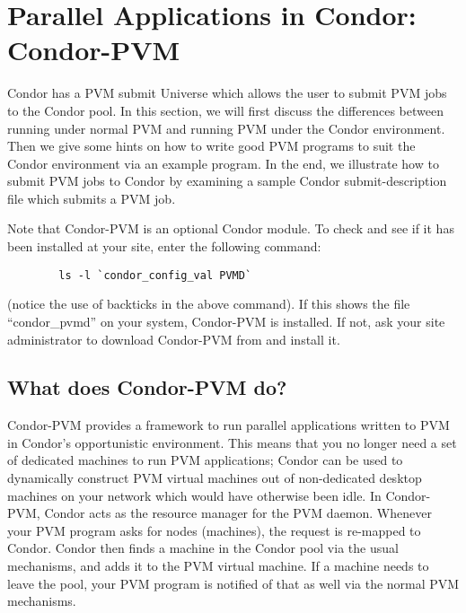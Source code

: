 \section{\label{sec:PVM}Parallel Applications in Condor: Condor-PVM}

\newcommand{\func}[1]{\texttt{#1}}

Condor has a PVM submit Universe which allows the user to submit PVM jobs to
the Condor pool.  In this section, we will first
discuss the differences between running under normal PVM and running PVM under the Condor
environment.  Then we give some hints on how to write good PVM
programs to suit the Condor environment via an example program.  In the
end, we illustrate how to submit PVM jobs to Condor by examining a
sample Condor submit-description file which submits a PVM job.

Note that Condor-PVM is an optional Condor module.  To check and see if
it has been installed at your site, enter the following command:
\begin{verbatim}
        ls -l `condor_config_val PVMD`
\end{verbatim}
(notice the use of backticks in the above command).  If this shows the
file ``condor\_pvmd'' on your system, Condor-PVM is installed.  If not,
ask your site administrator to download Condor-PVM from
 and install it.

\subsection{What does Condor-PVM do?}

Condor-PVM provides a framework to run parallel applications written to
PVM in Condor's opportunistic environment.  This means that you no
longer need a
set of dedicated machines to run PVM applications; Condor can be used to dynamically 
construct PVM virtual machines out of non-dedicated desktop machines on your network
which would have otherwise been idle.   In Condor-PVM, Condor acts as the
resource manager for the PVM daemon.  Whenever your PVM program asks
for nodes (machines), the request is re-mapped to Condor.  Condor then
finds a machine in the Condor pool via the usual mechanisms, and adds it
to the PVM virtual machine.  If a machine needs to leave the pool, your
PVM program is notified of that as well via the normal PVM mechanisms.

